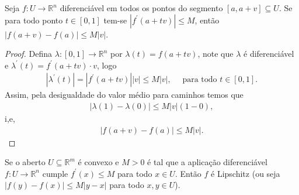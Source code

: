 \begin{theorem}
  Seja $f:U\to\mathbb{R}^{n}$ diferenciável em todos os pontos do segmento $[a,a+v]\subseteq U$. Se para todo ponto $t\in[0,1]$ tem-se $|f^{\prime}(a+tv)|\leq M$, então $|f(a+v)-f(a)|\leq M|v|$. 
\end{theorem}
\begin{proof} 
  Defina $\lambda:[0,1]\to\mathbb{R}^{n}$ por $\lambda(t)=f(a+tv)$, note que $\lambda$ é diferenciável e $\lambda^{\prime}(t)=f^{\prime}(a+tv)\cdot v$, logo
  \begin{align*}
    |\lambda^{\prime}(t)|=|f^{\prime}(a+tv)||v|\leq M|v|,\quad\text{ para todo }t\in[0,1].
  \end{align*}
  Assim, pela desigualdade do valor médio para caminhos temos que
  \begin{align*}
    |\lambda(1)-\lambda(0)|\leq M|v|(1-0),
  \end{align*}
  i,e,
  \begin{align*}
    |f(a+v)-f(a)|\leq M|v|.
  \end{align*}
\end{proof}
\begin{corollary}
  Se o aberto $U\subseteq \mathbb{R}^{m}$ é convexo e $M>0$ é tal que a aplicação diferenciável $f:U\to\mathbb{R}^{n}$ cumple $f^{\prime}(x)\leq M$ para todo $x\in U$. Então $f$ é Lipschitz (ou seja $|f(y)-f(x)|\leq M|y-x|$ para todo $x,y\in U$). 
\end{corollary}
